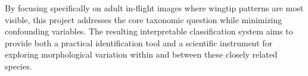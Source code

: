 By focusing specifically on adult in-flight images where wingtip patterns are most visible, this project addresses the core taxonomic question while minimizing confounding variables. The resulting interpretable classification system aims to provide both a practical identification tool and a scientific instrument for exploring morphological variation within and between these closely related species.
%
%
%
